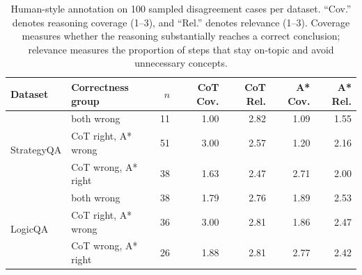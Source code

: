 \documentclass[11pt]{article}
\begin{document}
\begin{table}[t]
\centering
\small
\begin{tabular}{llrrrrr}
\toprule
Dataset & Correctness group & $n$ & CoT Cov. & CoT Rel. & A* Cov. & A* Rel. \\
\midrule
\multirow{3}{*}{StrategyQA}
& both wrong            & 11 & 1.00 & 2.82 & 1.09 & 1.55 \\
& CoT right, A* wrong   & 51 & 3.00 & 2.57 & 1.20 & 2.16 \\
& CoT wrong, A* right   & 38 & 1.63 & 2.47 & 2.71 & 2.00 \\
\midrule
\multirow{3}{*}{LogicQA}
& both wrong            & 38 & 1.79 & 2.76 & 1.89 & 2.53 \\
& CoT right, A* wrong   & 36 & 3.00 & 2.81 & 1.86 & 2.47 \\
& CoT wrong, A* right   & 26 & 1.88 & 2.81 & 2.77 & 2.42 \\
\bottomrule
\end{tabular}
\caption{Human-style annotation on 100 sampled disagreement cases per dataset. “Cov.” denotes reasoning coverage (1--3), and “Rel.” denotes relevance (1--3). Coverage measures whether the reasoning substantially reaches a correct conclusion; relevance measures the proportion of steps that stay on-topic and avoid unnecessary concepts.}
\label{tab:disagreement-human-eval}
\end{table}






\end{document}

